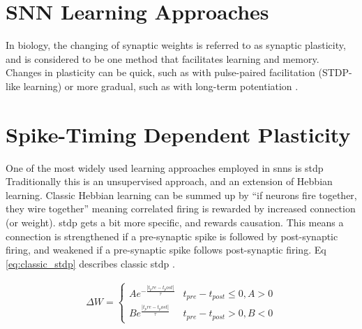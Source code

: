     
    \section{SNN Learning Approaches}
    In biology, the changing of synaptic weights is referred to as synaptic
    plasticity, and is considered to be one method that facilitates learning and
    memory. Changes in plasticity can be quick, such as with pulse-paired
    facilitation (STDP-like learning) or more gradual, such as with long-term
    potentiation \cite{ponulak_2011}.
    
    \section{Spike-Timing Dependent Plasticity}
    One of the most widely used learning approaches employed in \Glspl{snn} is
    \Gls{stdp} Traditionally this is an unsupervised approach, and an extension
    of Hebbian learning. Classic Hebbian learning can be summed up by ``if
    neurons fire together, they wire together'' meaning correlated firing is
    rewarded by increased connection (or weight). \Gls{stdp} gets a bit more
    specific, and rewards causation. This means a connection is strengthened if
    a pre-synaptic spike is followed by post-synaptic firing, and weakened if a
    pre-synaptic spike follows post-synaptic firing. Eq \ref{eq:classic_stdp}
    describes classic \Gls{stdp} \cite{tavanaei_2019}.

    \begin{align}
        \Delta W =
        \begin{cases}
          Ae^{-\frac{|t_pre-t_post|}{\tau}} & t_{pre} - t_{post} \leq 0, A > 0
          \\ Be^{\frac{|t_pre-t_post|}{\tau}} & t_{pre} - t_{post} > 0, B < 0
       \end{cases} \label{eq:classic_stdp}
    \end{align}

